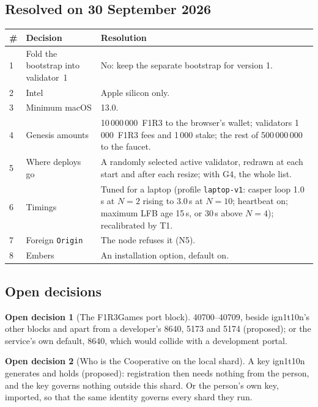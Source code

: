 \documentclass[11pt]{article}
\theoremstyle{definition}
\newtheorem{decision}{Open decision}
\theoremstyle{remark}
\newcommand{\code}[1]{\texttt{#1}}
\newcommand{\Hr}{ign1t10n}
\newcommand{\Gm}{F1R3Games}
\newcommand{\Em}{Embers}
\begin{document}
\subsection{Resolved on 30 September 2026}\label{sec:resolved}

\begin{center}\small
\renewcommand{\arraystretch}{1.12}
\begin{tabularx}{\linewidth}{@{}p{0.6cm}p{3.6cm}X@{}}
\toprule
\# & Decision & Resolution\\
\midrule
1 & Fold the bootstrap into validator~1 & No: keep the separate bootstrap for version 1.\\
2 & Intel & Apple silicon only.\\
3 & Minimum macOS & 13.0.\\
4 & Genesis amounts & 10\,000\,000~F1R3 to the browser's wallet; validators 1\,000~F1R3 fees and 1\,000 stake; the rest of 500\,000\,000 to the faucet.\\
5 & Where deploys go & A randomly selected active validator, redrawn at each start and after each resize; with G4, the whole list.\\
6 & Timings & Tuned for a laptop (profile \code{laptop-v1}: casper loop 1.0\,s at $N=2$ rising to 3.0\,s at $N=10$; heartbeat on; maximum LFB age 15\,s, or 30\,s above $N=4$); recalibrated by T1.\\
7 & Foreign \code{Origin} & The node refuses it (N5).\\
8 & \Em{} & An installation option, default on.\\
\bottomrule
\end{tabularx}
\end{center}

\subsection{Open decisions}

\setcounter{decision}{8}
\begin{decision}[The \Gm{} port block]\label{dec:ports}
40700--40709, beside \Hr{}'s other blocks and apart from a developer's 8640, 5173 and
5174 (proposed); or the service's own default, 8640, which would collide with a
development portal.
\end{decision}

\begin{decision}[Who is the Cooperative on the local shard]\label{dec:coop}
A key \Hr{} generates and holds (proposed): registration then needs nothing from the
person, and the key governs nothing outside this shard. Or the person's own key,
imported, so that the same identity governs every shard they run.
\end{decision}
\end{document}
